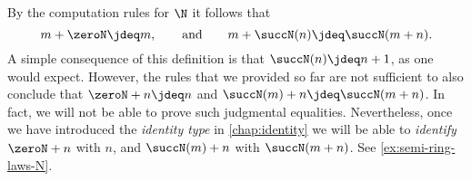 \begin{rmk}
  By the computation rules for $\N$ it follows that
  \begin{equation*}
    m+\zeroN\jdeq m,\qquad\text{and}\qquad m+\succN(n)\jdeq\succN(m+n).
  \end{equation*}
  A simple consequence of this definition is that $\succN(n)\jdeq n+1$, as one would expect. However, the rules that we provided so far are not sufficient to also conclude that $\zeroN+n\jdeq n$ and $\succN(m) + n\jdeq \succN(m+n)$. In fact, we will not be able to prove such judgmental equalities. Nevertheless, once we have introduced the \emph{identity type} in \cref{chap:identity} we will be able to \emph{identify} $\zeroN+n$ with $n$, and $\succN(m)+n$ with $\succN(m+n)$. See \cref{ex:semi-ring-laws-N}. 
\end{rmk}

